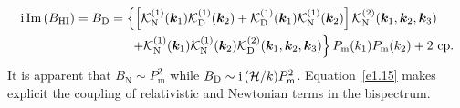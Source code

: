 \begin{itemize}
\begin{align}
\mathrm{i\,} \mathrm{Im} \left(B_{{\mathrm{HI}}}\right) &= B_\mathrm{D} = \left\{ \left[ \mathcal{K}^{(1)}_{\mathrm{N}}(\bm {k}_1)\mathcal{K}^{(1)}_{\mathrm{D}}(\bm {k}_2) + \mathcal{K}^{(1)}_{\mathrm{D}}(\bm {k}_1)\mathcal{K}^{(1)}_{\mathrm{N}}(\bm {k}_2)\right]\mathcal{K}^{(2)}_{\mathrm{N}}(\bm {k}_1,\bm {k}_2,\bm {k}_3) \right. \label{e1.15}\\ \nonumber 
&\left. ~~~~~~~~~~~~~ +\mathcal{K}^{(1)}_{\mathrm{N}}(\bm {k}_1)\mathcal{K}^{(1)}_{\mathrm{N}}(\bm {k}_2)\mathcal{K}^{(2)}_{\mathrm{D}}(\bm {k}_1,\bm {k}_2,\bm {k}_3)\right\}P_\mathrm{m} (k_{1})P_\mathrm{m} (k_{2})+\text{2 cp}.
\end{align}
It is apparent that {$B_\mathrm{N} \sim P_\mathrm{m} ^2$ while $B_\mathrm{D} \sim \mathrm{i\,} (\mathcal{H}/k) P_\mathrm{m} ^2$.}
Equation~\eqref{e1.15} makes explicit the coupling of relativistic  and Newtonian terms in the bispectrum.
\end{itemize}

